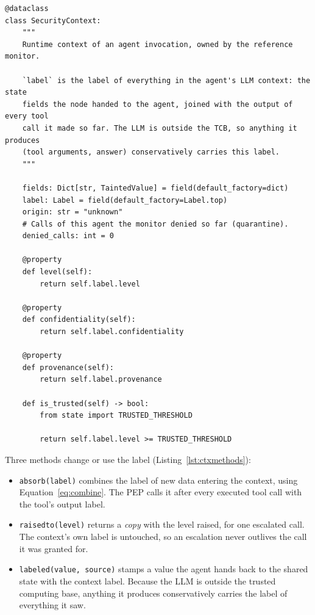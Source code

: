\documentclass[11pt,a4paper]{article}
\DeclareRobustCommand{\code}[1]{{\renewcommand{\_}{\textunderscore\allowbreak}\texttt{#1}}}
\begin{document}
\begin{lstlisting}[firstnumber=10,style=py,caption={Security context: state and accessors (\texttt{security/security\_context.py}, lines 10--42)},label={lst:ctx}]
@dataclass
class SecurityContext:
    """
    Runtime context of an agent invocation, owned by the reference monitor.

    `label` is the label of everything in the agent's LLM context: the state
    fields the node handed to the agent, joined with the output of every tool
    call it made so far. The LLM is outside the TCB, so anything it produces
    (tool arguments, answer) conservatively carries this label.
    """

    fields: Dict[str, TaintedValue] = field(default_factory=dict)
    label: Label = field(default_factory=Label.top)
    origin: str = "unknown"
    # Calls of this agent the monitor denied so far (quarantine).
    denied_calls: int = 0

    @property
    def level(self):
        return self.label.level

    @property
    def confidentiality(self):
        return self.label.confidentiality

    @property
    def provenance(self):
        return self.label.provenance

    def is_trusted(self) -> bool:
        from state import TRUSTED_THRESHOLD

        return self.label.level >= TRUSTED_THRESHOLD
\end{lstlisting}

Three methods change or use the label (Listing~\ref{lst:ctxmethods}):
\begin{itemize}
  \item \code{absorb(label)} combines the label of new data entering the context, using
        Equation~\eqref{eq:combine}. The PEP calls it after every executed tool call with
        the tool's output label.
  \item \code{raised\_to(level)} returns a \emph{copy} with the level raised, for one
        escalated call. The context's own label is untouched, so an escalation never
        outlives the call it was granted for.
  \item \code{labeled(value, source)} stamps a value the agent hands back to the shared
        state with the context label. Because the LLM is outside the trusted computing
        base, anything it produces conservatively carries the label of everything it saw.
\end{itemize}
\end{document}

